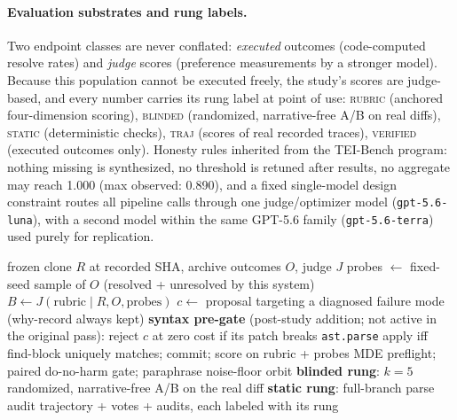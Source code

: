 \documentclass[11pt]{article}
\begin{document}
\paragraph{Evaluation substrates and rung labels.}
Two endpoint classes are never conflated: \emph{executed} outcomes
(code-computed resolve rates) and \emph{judge} scores (preference
measurements by a stronger model). Because this population cannot be executed
freely, the study's scores are judge-based, and every number carries its rung
label at point of use: \textsc{rubric} (anchored four-dimension scoring),
\textsc{blinded} (randomized, narrative-free A/B on real diffs),
\textsc{static} (deterministic checks), \textsc{traj} (scores of real recorded
traces), \textsc{verified} (executed outcomes only). Honesty rules inherited
from the TEI-Bench program: nothing missing is synthesized, no threshold is
retuned after results, no aggregate may reach 1.000 (max observed: 0.890), and
a fixed single-model design constraint routes all pipeline calls through one
judge/optimizer model (\texttt{gpt-5.6-luna}), with a second model within the same GPT-5.6 family
(\texttt{gpt-5.6-terra}) used purely for replication.

\begin{algorithm}[t]
\caption{TEI-SWE: one agent through the gated loop and the ladder}
\label{alg:loop}
\begin{algorithmic}[1]
\Require frozen clone $R$ at recorded SHA, archive outcomes $O$, judge $J$
\State probes $\gets$ fixed-seed sample of $O$ (resolved + unresolved by this system)
\State $B \gets J(\text{rubric} \mid R, O, \text{probes})$ 
 
  \State $c \gets$ proposal targeting a diagnosed failure mode (why-record always kept)
  \State \textbf{syntax pre-gate} (post-study addition; not active in the original pass): reject $c$ at zero cost if its patch breaks \texttt{ast.parse}
  \State apply iff find-block uniquely matches; commit; score on rubric + probes 
\EndFor
\State MDE preflight; paired do-no-harm gate; paraphrase noise-floor orbit
\State \textbf{blinded rung}: $k{=}5$ randomized, narrative-free A/B on the real diff 
\State \textbf{static rung}: full-branch parse audit 
\State \Return trajectory + votes + audits, each labeled with its rung
\end{algorithmic}
\end{algorithm}
\end{document}
